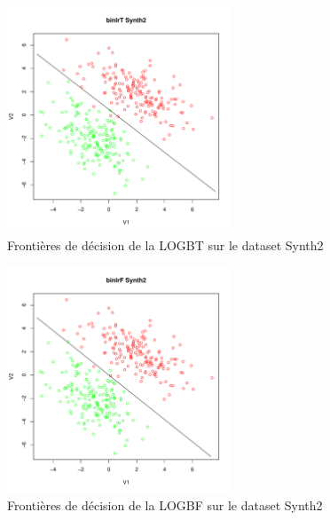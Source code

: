 \documentclass{report}
\begin{document}
\begin{figure}[ht!]
\begin{center}
    \includegraphics[width=0.6\textwidth]{results/binlrt/binlrt-Synth2.pdf}
    \caption{Frontières de décision de la LOGBT sur le dataset Synth2}
\end{center}
\end{figure}

\begin{figure}[ht!]
\begin{center}
    \includegraphics[width=0.6\textwidth]{results/binlrf/binlrf-Synth2.pdf}
    \caption{Frontières de décision de la LOGBF sur le dataset Synth2}
\end{center}
\end{figure}
\end{document}
